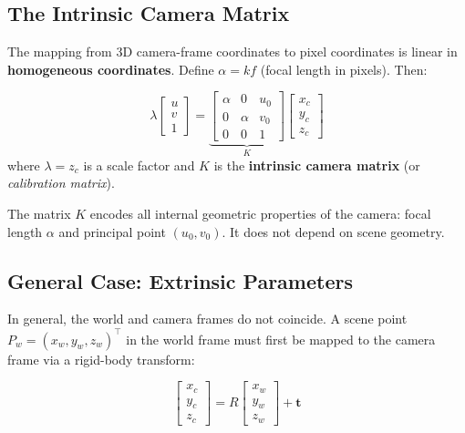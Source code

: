 \documentclass[11pt,a4paper]{article}
\theoremstyle{definition}
\theoremstyle{plain}
\theoremstyle{remark}
\newcommand{\p}[1]{\mathbf{#1}}             %
\begin{document}
\subsection{The Intrinsic Camera Matrix}

The mapping from 3D camera-frame coordinates to pixel coordinates is linear in \textbf{homogeneous coordinates}. Define $\alpha = kf$ (focal length in pixels). Then:

\begin{tcolorbox}[colback=blue!5!white,colframe=blue!75!black,title=\textbf{Perspective Projection in Homogeneous Coordinates}]
\[
\lambda \begin{bmatrix} u \\ v \\ 1 \end{bmatrix}
= \underbrace{\begin{bmatrix} \alpha & 0 & u_0 \\ 0 & \alpha & v_0 \\ 0 & 0 & 1 \end{bmatrix}}_{K}
\begin{bmatrix} x_c \\ y_c \\ z_c \end{bmatrix}
\]
where $\lambda = z_c$ is a scale factor and $K$ is the \textbf{intrinsic camera matrix} (or \textit{calibration matrix}).
\end{tcolorbox}

The matrix $K$ encodes all internal geometric properties of the camera: focal length $\alpha$ and principal point $(u_0, v_0)$. It does not depend on scene geometry.

\subsection{General Case: Extrinsic Parameters}

In general, the world and camera frames do not coincide. A scene point $P_w = (x_w, y_w, z_w)^\top$ in the world frame must first be mapped to the camera frame via a rigid-body transform:

\[
\begin{bmatrix} x_c \\ y_c \\ z_c \end{bmatrix} = R\begin{bmatrix} x_w \\ y_w \\ z_w \end{bmatrix} + \p{t}
\]
\end{document}
